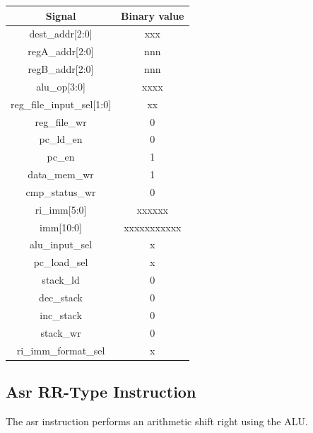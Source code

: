 \documentclass{article}
\begin{document}
\begin{par}
	\begin{center}
		\begin{tabular}{|c|c|}
			\hline 
			\textbf{Signal} & \textbf{Binary value} \\ 
			\hline 
			dest\_addr[2:0] & xxx \\ 
			\hline 
			regA\_addr[2:0] & nnn \\ 
			\hline 
			regB\_addr[2:0] & nnn \\ 
			\hline 
			alu\_op[3:0] & xxxx \\ 
			\hline 
			reg\_file\_input\_sel[1:0] & xx \\ 
			\hline 
			reg\_file\_wr & 0 \\ 
			\hline 
			pc\_ld\_en & 0 \\ 
			\hline 
			pc\_en & 1 \\ 
			\hline 
			data\_mem\_wr & 1 \\ 
			\hline 
			cmp\_status\_wr & 0 \\ 
			\hline 
			ri\_imm[5:0] & xxxxxx \\ 
			\hline 
			imm[10:0] & xxxxxxxxxxx \\ 
			\hline 
			alu\_input\_sel & x \\ 
			\hline 
			pc\_load\_sel & x \\ 
			\hline 
			stack\_ld & 0 \\ 
			\hline 
			dec\_stack & 0 \\ 
			\hline 
			inc\_stack & 0 \\ 
			\hline 
			stack\_wr & 0 \\ 
			\hline 
			ri\_imm\_format\_sel & x \\ 
			\hline 
		\end{tabular} 
	\end{center}

	\newpage
	\subsection{Asr RR-Type Instruction}
	
	The asr instruction performs an arithmetic shift right using the ALU. 
	

\end{par}
\end{document}
